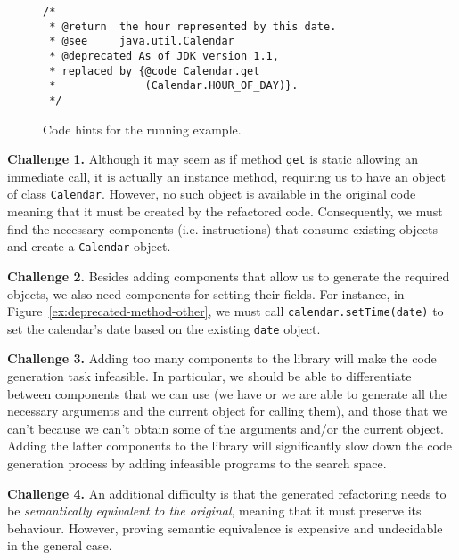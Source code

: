 \documentclass[10pt,conference]{IEEEtran}
\begin{document}
\begin{figure}
\begin{lstlisting}[mathescape=true,showstringspaces=false]
/*
 * @return  the hour represented by this date.
 * @see     java.util.Calendar
 * @deprecated As of JDK version 1.1,
 * replaced by {@code Calendar.get
 *              (Calendar.HOUR_OF_DAY)}.
 */  
\end{lstlisting}
\caption{Code hints for the running example.}
\label{ex:code-hints}
\end{figure}



{\bf Challenge 1.}  Although it may seem as if
method \texttt{get} is static allowing an immediate call,
it is actually an instance method, requiring us to have an object of
class \texttt{Calendar}. However, no such object is available in the
original code meaning that it must be created by the refactored code.
Consequently, we must find the necessary
components (i.e. instructions) that consume existing objects and create a \texttt{Calendar} object.

{\bf Challenge 2.} Besides adding components that allow us to generate the required objects, we also need components for setting their
fields. For instance,
in Figure~\ref{ex:deprecated-method-other}, we must call
\texttt{calendar.setTime(date)} to set the calendar's date
based on the existing \texttt{date} object.

{\bf Challenge 3.} Adding too many components to the library will
make the code generation task infeasible. In particular, we should
be able to differentiate between components that we can use
(we have or we are able to generate
all the necessary arguments and the current object for calling them), and those
that we can't because we can't obtain some of the arguments
and/or the current object. Adding the latter components to the library will
significantly slow down the code generation process by
adding infeasible programs to the search space.

{\bf Challenge 4.} An additional difficulty is that the generated refactoring needs to be {\em semantically equivalent to the original}, meaning that it must preserve its behaviour.
However, proving semantic equivalence is expensive and undecidable in the general case. %
\end{document}
